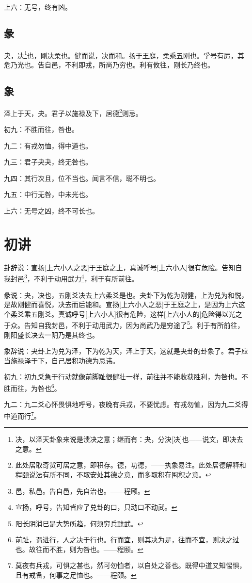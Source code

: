 \documentclass[12pt,oneside]{book}
\begin{document}
上六：无号，终有凶。

\subsection{彖}
夬，决\footnote{决，以泽天卦象来说是溃决之意；继而有：夬，分決[决]也——说文，即决去之意。}也，刚决柔也。健而说，决而和。扬于王庭，柔乘五刚也。孚号有厉，其危乃光也。告自邑，不利即戎，所尚乃穷也。利有攸往，刚长乃终也。

\subsection{象}
泽上于天，夬。君子以施禄及下，居德\footnote{此处居取奇货可居之意，即积存。德，功德，——执象易注。此处居德解释和程颐说法有所不同，不取安处其德之意，而多取积存囤积之意。}则忌。

初九：不胜而往，咎也。

九二：有戎勿恤，得中道也。

九三：君子夬夬，终无咎也。

九四：其行次且，位不当也。闻言不信，聪不明也。

九五：中行无咎，中未光也。

上六：无号之凶，终不可长也。

\section{初讲}
卦辞说：宣扬[上六小人之恶]于王庭之上，真诚呼号[上六小人]很有危险。告知自我封邑\footnote{邑，私邑。告自邑，先自治也。——程颐。}，不利于动用武力\footnote{宣扬，呼号，告知皆应了兑卦的口，只动口不动武。}，利于有所前往。

彖说：夬，决也，五刚爻决去上六柔爻是也。夬卦下为乾为刚健，上为兑为和悦，是故刚健而喜悦，决去而后能和。宣扬[上六小人之恶]于王庭之上，是因为上六这个柔爻乘五刚爻。真诚呼号[上六小人]很有危险，这样[上六小人的]危险得以光之于众。告知自我封邑，不利于动用武力，因为尚武乃是穷途了\footnote{阳长阴消已是大势所趋，何须穷兵黩武。}。利于有所前往，刚阳盛长决去一阴乃是其终也。

象辞说：夬卦上为兑为泽，下为乾为天，泽上于天，这就是夬卦的卦象了。君子应当施禄泽于下，自己居积功德为忌讳。

初九：初九爻急于行动就像前脚趾很健壮一样，前往并不能收获胜利，为咎也。不胜而往，为咎也\footnote{前趾，谓进行，人之决于行也。行而宜，则其决为是，往而不宜，则决之过也。故往而不胜，则为咎也。——程颐。}。

九二：九二爻心怀畏惧地呼号，夜晚有兵戎，不要忧虑。有戎勿恤，因为九二爻得中道而行\footnote{莫夜有兵戎，可惧之甚也，然可勿恤者，以自处之善也。既得中道又知惕惧，且有戒备，何事之足恤也。——程颐。}。
\end{document}
